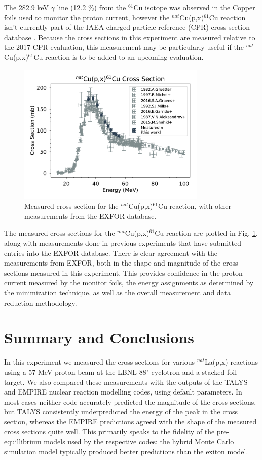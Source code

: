 \documentclass[aps,twocolumn,secnumarabic,balancelastpage,amsmath,amssymb,nofootinbib,floatfix]{revtex4-1}
\begin{document}
The 282.9 keV $\gamma$ line (12.2 \%) from the $^{61}$Cu isotope was observed in the Copper foils used to monitor the proton current, however the $^{nat}$Cu(p,x)$^{61}$Cu reaction isn't currently part of the IAEA charged particle reference (CPR) cross section database \cite{IAEACPR}.  Because the cross sections in this experiment are measured relative to the 2017 CPR evaluation, this measurement may be particularly useful if the $^{nat}$Cu(p,x)$^{61}$Cu reaction is to be added to an upcoming evaluation.

\begin{figure}[htb]
\includegraphics[width=9cm]{cross_sections/61CU}
\caption{Measured cross section for the $^{nat}$Cu(p,x)$^{61}$Cu reaction, with other measurements from the EXFOR database.
}
\label{fig:61CU}
\end{figure}

The measured cross sections for the $^{nat}$Cu(p,x)$^{61}$Cu reaction are plotted in Fig. \ref{fig:61CU}, along with measurements done in previous experiments that have submitted entries into the EXFOR database.  There is clear agreement with the measurements from EXFOR, both in the shape and magnitude of the cross sections measured in this experiment.  This provides confidence in the proton current measured by the monitor foils, the energy assignments as determined by the minimization technique, as well as the overall measurement and data reduction methodology.


\section{Summary and Conclusions}
In this experiment we measured the cross sections for various $^{nat}$La(p,x) reactions using a 57 MeV proton beam at the LBNL 88" cyclotron and a stacked foil target.  We also compared these measurements with the outputs of the TALYS and EMPIRE nuclear reaction modelling codes, using default parameters.  In most cases neither code accurately predicted the magnitude of the cross sections, but TALYS consistently underpredicted the energy of the peak in the cross section, whereas the EMPIRE predictions agreed with the shape of the measured cross sections quite well.  This primarily speaks to the fidelity of the pre-equillibrium models used by the respective codes: the hybrid Monte Carlo simulation model typically produced better predictions than the exiton model.
\end{document}

